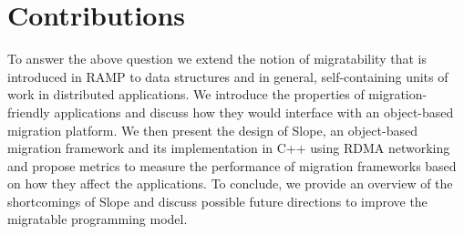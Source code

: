 \section{Contributions}
To answer the above question we extend the notion of migratability that is
introduced in RAMP \cite{memon2018ramp} to data structures and in general,
self-containing units of work in distributed applications.
We introduce
the properties of migration-friendly applications and discuss
how they would interface with an object-based migration platform.
We then present the design of Slope, an object-based migration framework
and its implementation in C++ using RDMA networking and propose metrics
to measure the performance of migration frameworks based on how they affect
the applications.
To conclude, we provide an overview of the shortcomings of Slope and
discuss possible future directions to improve the migratable programming model.

